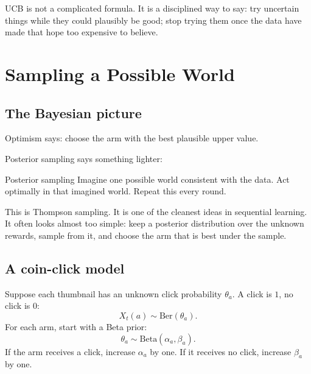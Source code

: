 \documentclass[en,nofont,11pt]{elegantbook}
\newcommand{\Ber}{\mathrm{Ber}}
\newcommand{\Beta}{\mathrm{Beta}}
\begin{document}
\begin{takeawaybox}
UCB is not a complicated formula. It is a disciplined way to say: try uncertain things while they could plausibly be good; stop trying them once the data have made that hope too expensive to believe.
\end{takeawaybox}

\chapter{Sampling a Possible World}

\section{The Bayesian picture}

Optimism says: choose the arm with the best plausible upper value.

Posterior sampling says something lighter:

\begin{plainbox}{Posterior sampling}
Imagine one possible world consistent with the data. Act optimally in that imagined world. Repeat this every round.
\end{plainbox}

This is Thompson sampling. It is one of the cleanest ideas in sequential learning. It often looks almost too simple: keep a posterior distribution over the unknown rewards, sample from it, and choose the arm that is best under the sample.

\section{A coin-click model}

Suppose each thumbnail has an unknown click probability $\theta_a$. A click is $1$, no click is $0$:
\[
X_t(a)\sim\Ber(\theta_a).
\]
For each arm, start with a Beta prior:
\[
\theta_a\sim\Beta(\alpha_a,\beta_a).
\]
If the arm receives a click, increase $\alpha_a$ by one. If it receives no click, increase $\beta_a$ by one.
\end{document}
